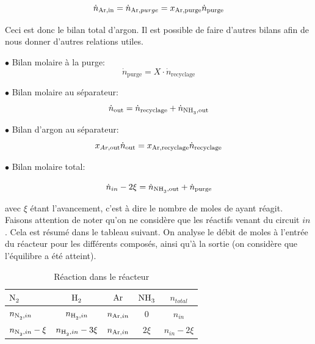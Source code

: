 \documentclass[a4paper, oneside, 12pt]{article}
\begin{document}
\begin{equation}
\dot{n}_{\ce{Ar},\text{in}}=\dot{n}_{\ce{Ar},purge}=x_{\ce{Ar},\text{purge}} \dot{n}_{\text{purge}}
\end{equation}

Ceci est donc le bilan total d'argon. 
Il est possible de faire d'autres bilans afin de nous donner d'autres relations utiles.

$\bullet$ Bilan molaire à la purge:
\begin{equation}
\dot{n}_{\text{purge}} = X \cdot \dot{n}_{\text{recyclage}}
\label{eq:bilan_mol_purge}
\end{equation}

$\bullet$ Bilan molaire au séparateur:
\begin{equation}
\dot{n}_{\text{out}}=\dot{n}_{\text{recyclage}}+\dot{n}_{\ce{NH3},\text{out}}
\label{eq:bilan_mol_sep}
\end{equation}

$\bullet$ Bilan d'argon au séparateur:
\begin{equation}
x_{Ar,\text{out}} \dot{n}_{\text{out}}=x_{\ce{Ar},\text{recyclage}} \dot{n}_{\text{recyclage}}
\end{equation}

$\bullet$ Bilan molaire total:

\begin{equation}
	\dot{n}_{in} - 2\xi=\dot{n}_{\ce{NH3},\text{out}} + \dot{n}_{\text{purge}}
	\label{eq:bilan_mol_tot}
\end{equation}

avec $\xi$ étant l'avancement, c'est à dire le nombre de moles de  ayant réagit. 
Faisons attention de noter qu'on ne considère que les réactifs venant du circuit $in$. 
Cela est résumé dans le tableau suivant. 
On analyse le débit de moles à l'entrée du réacteur pour les différents composés, 
ainsi qu'à la sortie (on considère que l'équilibre a été atteint).

\begin{table}[h!]
	\centering
	\begin{tabular}{l|c|c|c|c}
		$\ce{N2}$ & $\ce{H2}$ & $\ce{Ar}$ & $\ce{NH3}$ & $n_{total}$ \\
		\hline
		$n_{\ce{N2},in}$ & $n_{\ce{H2},in}$ & $n_{\ce{Ar},in}$ & $0$  & $n_{in}$\\
		$n_{\ce{N2},in}-\xi$ & $n_{\ce{H2},in}-3\xi$ & $n_{\ce{Ar},in}$ & $2\xi$  & $n_{in}-2\xi$\\
	\end{tabular}
	\caption{Réaction dans le réacteur}
	\label{tab:reaction1_primaire}
\end{table}
\end{document}
